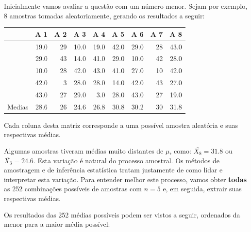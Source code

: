 \documentclass[
]{book}
\begin{document}
Inicialmente vamos avaliar a questão com um número menor. Sejam por exemplo, 8 amostras tomadas aleatoriamente, gerando os resultados a seguir:

\begin{tabular}{l|r|r|r|r|r|r|r|r}
\hline
  & A 1 & A 2 & A 3 & A 4 & A 5 & A 6 & A 7 & A 8\\
\hline
 & 19.0 & 29 & 10.0 & 19.0 & 42.0 & 29.0 & 28 & 43.0\\
\hline
 & 29.0 & 43 & 14.0 & 41.0 & 29.0 & 10.0 & 42 & 28.0\\
\hline
 & 10.0 & 28 & 42.0 & 43.0 & 41.0 & 27.0 & 10 & 42.0\\
\hline
 & 42.0 & 3 & 28.0 & 28.0 & 14.0 & 42.0 & 43 & 27.0\\
\hline
 & 43.0 & 27 & 29.0 & 3.0 & 28.0 & 43.0 & 27 & 19.0\\
\hline
Medias & 28.6 & 26 & 24.6 & 26.8 & 30.8 & 30.2 & 30 & 31.8\\
\hline
\end{tabular}

Cada coluna desta matriz corresponde a uma possível amostra aleatória e suas respectivas médias.

Algumas amostras tiveram médias muito distantes de \(\mu\), como: \(\overline{X_{8}} = 31.8\) ou \(\overline{X_{3}} = 24.6\). Esta variação é natural do processo amostral. Os métodos de amostragem e de inferência estatística tratam justamente de como lidar e interpretar esta variação. Para entender melhor este processo, vamos obter \textbf{todas} as 252 combinações possíveis de amostras com \(n = 5\) e, em seguida, extrair suas respectivas médias.

Os resultados das 252 médias possíveis podem ser vistos a seguir, ordenados da menor para a maior média possível:
\end{document}
